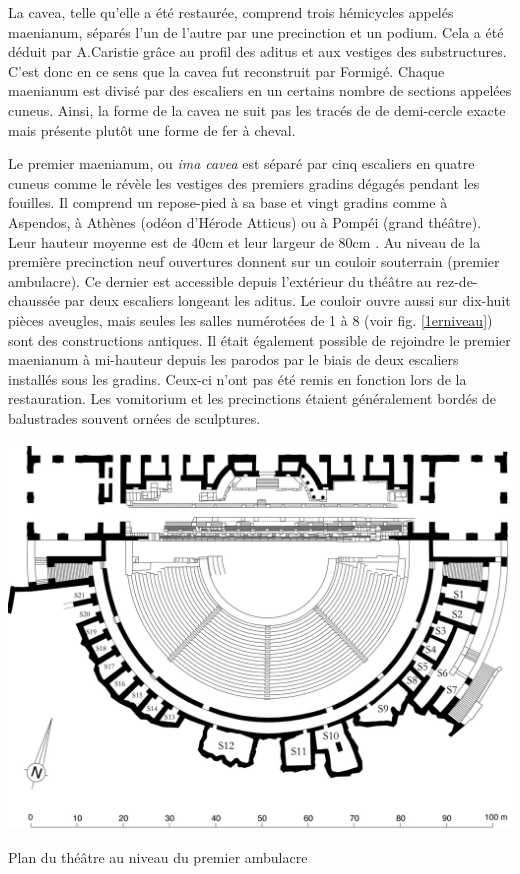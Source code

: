 		La  \gls{cavea}, telle qu'elle a été restaurée, comprend trois hémicycles appelés \gls{maenianum}, séparés l'un de l'autre par une \gls{precinction} et un \gls{podium}. Cela a été déduit par A.Caristie grâce au profil des \gls{aditus} et aux vestiges des substructures. C'est donc en ce sens que la cavea fut reconstruit par Formigé. Chaque \gls{maenianum} est divisé par des escaliers en un certains nombre de sections appelées \gls{cuneus}. Ainsi, la forme de la \gls{cavea} ne suit pas les tracés de \cite{vitruve} de demi-cercle exacte mais présente plutôt une forme de fer à cheval.
		
		Le premier \gls{maenianum}, ou \textit{ima cavea} est séparé par cinq escaliers en quatre \gls{cuneus} comme le révèle les vestiges des premiers gradins dégagés pendant les fouilles. Il comprend un repose-pied à sa base et vingt gradins comme à Aspendos, à Athènes (odéon d'Hérode Atticus) ou à Pompéi (grand théâtre). Leur hauteur moyenne est de 40cm et leur largeur de 80cm \cite{formige}. Au niveau de la première \gls{precinction} neuf ouvertures donnent  sur un couloir souterrain (premier \gls{ambulacre}). Ce dernier est accessible depuis l'extérieur du théâtre au rez-de-chaussée par deux escaliers longeant les \gls{aditus}. Le couloir ouvre aussi sur dix-huit pièces aveugles, mais seules les salles numérotées de 1 à 8 (voir fig. \ref{1erniveau}) sont des constructions antiques. Il était également possible de rejoindre le premier \gls{maenianum} à mi-hauteur depuis les \gls{parodos} par le biais de deux escaliers installés sous les gradins. Ceux-ci n'ont pas été remis en fonction lors de la restauration. Les \gls{vomitorium} et les \glspl{precinction} étaient généralement bordés de balustrades souvent ornées de sculptures.
		
	\begin{figureth}
		\includegraphics[width=\linewidth]{images/1erniveau}
		\caption[Vue de dessus - 1er niveau]{Plan du théâtre au niveau du premier ambulacre \cite[Pl. XVII]{orangePl}}
		\label{1erniveau}
	\end{figureth}		
		
